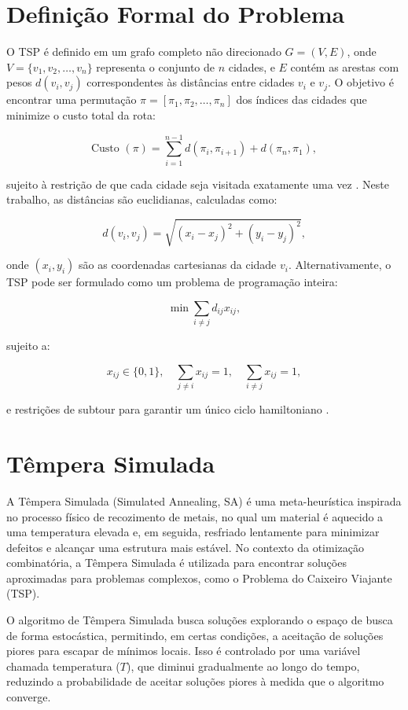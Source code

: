 \documentclass[12pt]{article}
\begin{document}
\section{Definição Formal do Problema}
O TSP é definido em um grafo completo não direcionado \(G = \left(V, E\right)\), onde \(V = \{v_1, v_2, \ldots, v_n\}\) representa o conjunto de \(n\) cidades, e \(E\) contém as arestas com pesos \(d\left(v_i, v_j\right)\) correspondentes às distâncias entre cidades \(v_i\) e \(v_j\). O objetivo é encontrar uma permutação \(\pi = \left[\pi_1, \pi_2, \ldots, \pi_n\right]\) dos índices das cidades que minimize o custo total da rota:

\[
\text{Custo }(\pi) = \sum_{i=1}^{n-1} d\left(\pi_i, \pi_{i+1}\right) + d\left(\pi_n, \pi_1\right),
\]

sujeito à restrição de que cada cidade seja visitada exatamente uma vez \cite{nilsson1982}. Neste trabalho, as distâncias são euclidianas, calculadas como:

\[
d\left(v_i, v_j\right) = \sqrt{\left(x_i - x_j\right)^2 + \left(y_i - y_j\right)^2},
\]

onde \(\left(x_i, y_i\right)\) são as coordenadas cartesianas da cidade \(v_i\). Alternativamente, o TSP pode ser formulado como um problema de programação inteira:

\[
\min \sum_{i \neq j} d_{ij} x_{ij},
\]

sujeito a:

\[
x_{ij} \in \{0,1\}, \quad \sum_{j \neq i} x_{ij} = 1, \quad \sum_{i \neq j} x_{ij} = 1,
\]

e restrições de subtour para garantir um único ciclo hamiltoniano \cite{orman2006}.

\section{Têmpera Simulada}

A Têmpera Simulada (Simulated Annealing, SA) é uma meta-heurística inspirada no processo físico de recozimento de metais, no qual um material é aquecido a uma temperatura elevada e, em seguida, resfriado lentamente para minimizar defeitos e alcançar uma estrutura mais estável. No contexto da otimização combinatória, a Têmpera Simulada é utilizada para encontrar soluções aproximadas para problemas complexos, como o Problema do Caixeiro Viajante (TSP).

O algoritmo de Têmpera Simulada busca soluções explorando o espaço de busca de forma estocástica, permitindo, em certas condições, a aceitação de soluções piores para escapar de mínimos locais. Isso é controlado por uma variável chamada temperatura (\(T\)), que diminui gradualmente ao longo do tempo, reduzindo a probabilidade de aceitar soluções piores à medida que o algoritmo converge.
\end{document}
